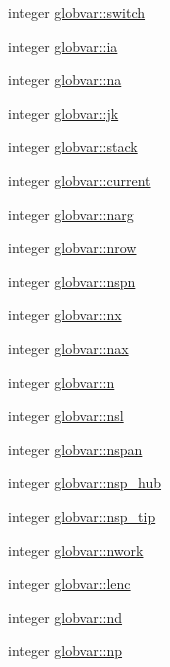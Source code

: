 \begin{DoxyCompactItemize}
integer \hyperlink{namespaceglobvar_a505145f479910632ea341b88c8333e04}{globvar\+::switch}
\item 
integer \hyperlink{namespaceglobvar_ae4e17de7f28c6c5fa62413a151e30d71}{globvar\+::ia}
\item 
integer \hyperlink{namespaceglobvar_a3153e29591fc002f684b857f0517a322}{globvar\+::na}
\item 
integer \hyperlink{namespaceglobvar_a63113b636acdd2b247b3e2df6cdac555}{globvar\+::jk}
\item 
integer \hyperlink{namespaceglobvar_af2a9883201aae595b762ba7ca329a73e}{globvar\+::stack}
\item 
integer \hyperlink{namespaceglobvar_ab96395218a22f28f54d4972183ff613b}{globvar\+::current}
\item 
integer \hyperlink{namespaceglobvar_a3b61c37b105aa02078586405cc370389}{globvar\+::narg}
\item 
integer \hyperlink{namespaceglobvar_a800cf6c01b61ed57a87bd315e1d9efa2}{globvar\+::nrow}
\item 
integer \hyperlink{namespaceglobvar_a893893112c0ec18c6931ce39f595fd96}{globvar\+::nspn}
\item 
integer \hyperlink{namespaceglobvar_ae4d2e4d1bd4180999afe29337165e1e6}{globvar\+::nx}
\item 
integer \hyperlink{namespaceglobvar_acff3033374e6d73d14fb06fc53fc205c}{globvar\+::nax}
\item 
integer \hyperlink{namespaceglobvar_ae2a801b02d21360936653383c17f8310}{globvar\+::n}
\item 
integer \hyperlink{namespaceglobvar_a5ffdff1f4afd2fecd622bee9fbe37442}{globvar\+::nsl}
\item 
integer \hyperlink{namespaceglobvar_adeb7d084c25deee7802eab03d40830c5}{globvar\+::nspan}
\item 
integer \hyperlink{namespaceglobvar_a2102305906fb17109fa9be746d11cf64}{globvar\+::nsp\+\_\+hub}
\item 
integer \hyperlink{namespaceglobvar_a0fe2d3e9a20697e0e419f91d67295872}{globvar\+::nsp\+\_\+tip}
\item 
integer \hyperlink{namespaceglobvar_a14eadfde6f84c7aec720cf0c0e828e3a}{globvar\+::nwork}
\item 
integer \hyperlink{namespaceglobvar_a00121cf01b80ef938df02e8b6a38231c}{globvar\+::lenc}
\item 
integer \hyperlink{namespaceglobvar_abefec70ea6b9f0d35b7cc330cd8ed601}{globvar\+::nd}
\item 
integer \hyperlink{namespaceglobvar_ab80f0f7f25dc40712c12c67edf2c7112}{globvar\+::np}

\end{DoxyCompactItemize}
